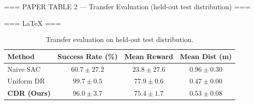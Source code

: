 === PAPER TABLE 2 — Transfer Evaluation (held-out test distribution) ===



=== LaTeX ===

\begin{table}[h]
\centering
\begin{tabular}{lccc}
\hline
Method & Success Rate (\%) & Mean Reward & Mean Dist (m) \\
\hline
Naive SAC & $60.7 \pm 27.2$ & $23.8 \pm 27.6$ & $0.96 \pm 0.30$ \\
Uniform DR & $99.7 \pm 0.5$ & $77.9 \pm 0.6$ & $0.47 \pm 0.00$ \\
\textbf{CDR (Ours)} & $96.0 \pm 3.7$ & $75.4 \pm 1.7$ & $0.53 \pm 0.08$ \\
\hline
\end{tabular}
\caption{Transfer evaluation on held-out test distribution.}
\label{tab:transfer_results}
\end{table}